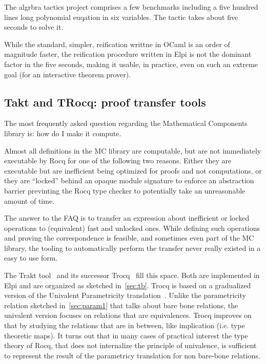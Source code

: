 \documentclass[a4paper, 11pt]{book}
\begin{document}
The algrbra tactics project comprises a few benchmarks including
a five hundred lines long polynomial euqation in six variables.
The  tactic takes about five seconds to solve it.

While the standard, simpler, reification writtne in OCaml is an order of
magnitude faster, the reification procedure written in Elpi is not the dominant
factor in the five seconds, making it usable, in practice, even on such an
extreme goal (for an interactive theorem prover).


\subsection{Takt and TRocq: proof transfer tools}

The most frequently asked question regarding the Mathematical Components
library is: how do I make it compute.

Almost all definitions in the MC library
are computable, but are not immediately executable by Rocq for one of
the following two reasons. Either they are executable but are inefficient
being optimized for proofs and not computations, or they are ``locked''
behind an opaque module signature to enforce an abstraction barrier previnting
the Rocq type checker to potentially take an unreasonable amount of time.

The answer to the FAQ is to transfer an expression about inefficient or
locked operations to (equivalent) fast and unlocked ones. While defining
such operations and proving the correspondence is feasible, and sometimes
even part of the MC library, the tooling to automatically perform
the transfer never really existed in a easy to use form.

The Trakt tool~\cite{DBLP:conf/cpp/Blot0CPKMV23} and its successor
Trocq~\cite{10.1007/978-3-031-57262-3_10} fill this space. Both
are implemented in Elpi and are organized as sketched in~\ref{sec:tb}.
Trocq is based on a gradualized version of the Univalent Parametricity
translation~\cite{10.1145/3429979}. Unlike the parametricity relation
sketched in~\ref{sec:param1} that talks about bare bone relations, the univalent
version focuses on relations that are equivalences.
Trocq improves on that by studying the relations that are in between,
like implication (i.e. type theoretic maps).
It turns out that in many cases of practical interest the type
theory of Rocq, that does not internalize the principle of univalence, is
sufficient to represent the result of the parametricy translation
for non bare-bone relations.
\end{document}
